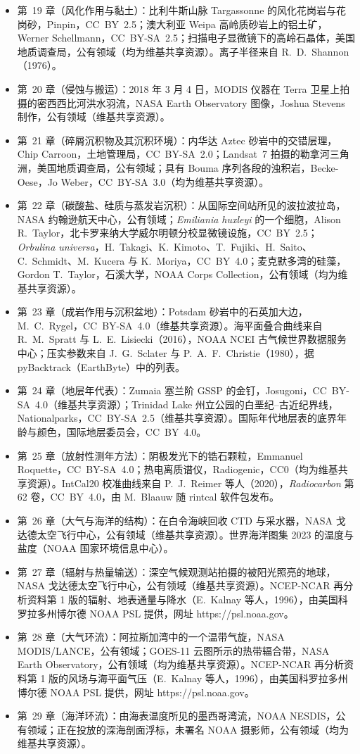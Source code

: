 \begin{itemize}
  \item 第~19 章（风化作用与黏土）：比利牛斯山脉 Targassonne 的风化花岗岩与花岗砂，Pinpin，CC~BY~2.5；澳大利亚 Weipa 高岭质砂岩上的铝土矿，Werner Schellmann，CC~BY-SA~2.5；扫描电子显微镜下的高岭石晶体，美国地质调查局，公有领域（均为维基共享资源）。离子半径来自 R.~D.~Shannon（1976）。
  \item 第~20 章（侵蚀与搬运）：2018 年 3 月 4 日，MODIS 仪器在 Terra 卫星上拍摄的密西西比河洪水羽流，NASA Earth Observatory 图像，Joshua Stevens 制作，公有领域（维基共享资源）。
  \item 第~21 章（碎屑沉积物及其沉积环境）：内华达 Aztec 砂岩中的交错层理，Chip Carroon，土地管理局，CC~BY-SA~2.0；Landsat~7 拍摄的勒拿河三角洲，美国地质调查局，公有领域；具有 Bouma 序列各段的浊积岩，Becke-Oese，Jo Weber，CC~BY-SA~3.0（均为维基共享资源）。
  \item 第~22 章（碳酸盐、硅质与蒸发岩沉积）：从国际空间站所见的波拉波拉岛，NASA 约翰逊航天中心，公有领域；\emph{Emiliania huxleyi} 的一个细胞，Alison R.~Taylor，北卡罗来纳大学威尔明顿分校显微镜设施，CC~BY~2.5；\emph{Orbulina universa}，H.~Takagi、K.~Kimoto、T.~Fujiki、H.~Saito、C.~Schmidt、M.~Kucera 与 K.~Moriya，CC~BY~4.0；麦克默多湾的硅藻，Gordon T.~Taylor，石溪大学，NOAA Corps Collection，公有领域（均为维基共享资源）。
  \item 第~23 章（成岩作用与沉积盆地）：Potsdam 砂岩中的石英加大边，M.~C.~Rygel，CC~BY-SA~4.0（维基共享资源）。海平面叠合曲线来自 R.~M.~Spratt 与 L.~E.~Lisiecki（2016），NOAA NCEI 古气候世界数据服务中心；压实参数来自 J.~G.~Sclater 与 P.~A.~F.~Christie（1980），据 pyBacktrack（EarthByte）中的列表。
  \item 第~24 章（地层年代表）：Zumaia 塞兰阶 GSSP 的金钉，Josugoni，CC~BY-SA~4.0（维基共享资源）；Trinidad Lake 州立公园的白垩纪--古近纪界线，Nationalparks，CC~BY-SA~2.5（维基共享资源）。国际年代地层表的底界年龄与颜色，国际地层委员会，CC~BY~4.0。
  \item 第~25 章（放射性测年方法）：阴极发光下的锆石颗粒，Emmanuel Roquette，CC~BY-SA~4.0；热电离质谱仪，Radiogenic，CC0（均为维基共享资源）。IntCal20 校准曲线来自 P.~J.~Reimer 等人（2020），\emph{Radiocarbon} 第 62 卷，CC~BY~4.0，由 M.~Blaauw 随 rintcal 软件包发布。
  \item 第~26 章（大气与海洋的结构）：在白令海峡回收 CTD 与采水器，NASA 戈达德太空飞行中心，公有领域（维基共享资源）。世界海洋图集 2023 的温度与盐度（NOAA 国家环境信息中心）。
  \item 第~27 章（辐射与热量输送）：深空气候观测站拍摄的被阳光照亮的地球，NASA 戈达德太空飞行中心，公有领域（维基共享资源）。NCEP-NCAR 再分析资料第 1 版的辐射、地表通量与降水（E.~Kalnay 等人，1996），由美国科罗拉多州博尔德 NOAA PSL 提供，网址 https://psl.noaa.gov。
  \item 第~28 章（大气环流）：阿拉斯加湾中的一个温带气旋，NASA MODIS/LANCE，公有领域；GOES-11 云图所示的热带辐合带，NASA Earth Observatory，公有领域（均为维基共享资源）。NCEP-NCAR 再分析资料第 1 版的风场与海平面气压（E.~Kalnay 等人，1996），由美国科罗拉多州博尔德 NOAA PSL 提供，网址 https://psl.noaa.gov。
  \item 第~29 章（海洋环流）：由海表温度所见的墨西哥湾流，NOAA NESDIS，公有领域；正在投放的深海剖面浮标，未署名 NOAA 摄影师，公有领域（均为维基共享资源）。
\end{itemize}
